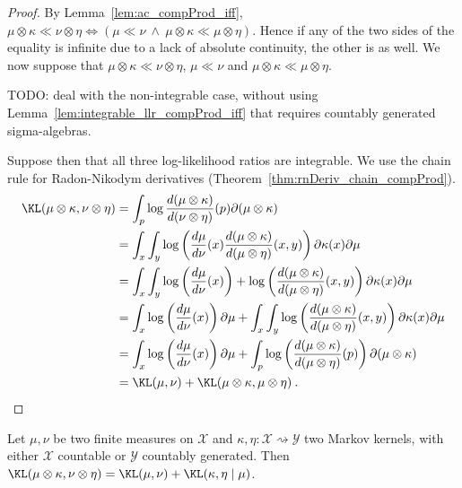 \begin{proof}%
{}
By Lemma~\ref{lem:ac_compProd_iff}, $\mu \otimes \kappa \ll \nu \otimes \eta \iff \left( \mu \ll \nu \ \wedge \ \mu \otimes \kappa \ll \mu \otimes \eta \right)$.
Hence if any of the two sides of the equality is infinite due to a lack of absolute continuity, the other is as well.
We now suppose that $\mu \otimes \kappa \ll \nu \otimes \eta$, $\mu \ll \nu$ and $\mu \otimes \kappa \ll \mu \otimes \eta$.

TODO: deal with the non-integrable case, without using Lemma~\ref{lem:integrable_llr_compProd_iff} that requires countably generated sigma-algebras.

Suppose then that all three log-likelihood ratios are integrable.
We use the chain rule for Radon-Nikodym derivatives (Theorem~\ref{thm:rnDeriv_chain_compProd}).
\begin{align*}
\KL(\mu \otimes \kappa, \nu \otimes \eta)
&= \int_p \log \frac{d(\mu \otimes \kappa)}{d(\nu \otimes \eta)}(p) \partial (\mu \otimes \kappa)
\\
&= \int_x \int_y\log \left(\frac{d\mu}{d \nu}(x)\frac{d(\mu \otimes \kappa)}{d (\mu \otimes \eta)}(x,y)\right) \partial \kappa(x) \partial\mu
\\
&= \int_x \int_y\log \left(\frac{d\mu}{d \nu}(x)\right) + \log \left(\frac{d(\mu \otimes \kappa)}{d (\mu \otimes \eta)}(x,y)\right) \partial \kappa(x) \partial\mu
\\
&= \int_x \log \left(\frac{d\mu}{d \nu}(x)\right)\partial\mu + \int_x \int_y\log \left(\frac{d(\mu \otimes \kappa)}{d (\mu \otimes \eta)}(x,y)\right) \partial \kappa(x) \partial\mu
\\
&= \int_x \log \left(\frac{d\mu}{d \nu}(x)\right)\partial\mu + \int_p\log \left(\frac{d(\mu \otimes \kappa)}{d (\mu \otimes \eta)}(p)\right) \partial (\mu \otimes \kappa)
\\
&= \KL(\mu, \nu) + \KL(\mu \otimes \kappa, \mu \otimes \eta)
\: .
\end{align*}
\end{proof}


\begin{theorem}
  \label{thm:kl_compProd}
  \leanok
  Let $\mu, \nu$ be two finite measures on $\mathcal X$ and $\kappa, \eta : \mathcal X \rightsquigarrow \mathcal Y$ two Markov kernels, with either $\mathcal X$ countable or $\mathcal{Y}$ countably generated.
  Then $\KL(\mu \otimes \kappa, \nu \otimes \eta) = \KL(\mu, \nu) + \KL(\kappa, \eta \mid \mu)$.
\end{theorem}

